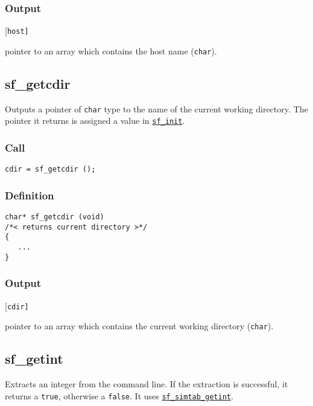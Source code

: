 \subsubsection*{Output}
\begin{desclist}{\tt }{\quad}[\tt host]
   \setlength\itemsep{0pt}
   \item[host] pointer to an array which contains the host name (\texttt{char}).
\end{desclist}




\subsection{{sf\_getcdir}}
Outputs a pointer of \texttt{char} type to the name of the current working directory. The pointer it returns is assigned a value in \hyperref[sec:sf_init]{\texttt{sf\_init}}.

\subsubsection*{Call}
\begin{verbatim}cdir = sf_getcdir ();\end{verbatim}

\subsubsection*{Definition}
\begin{verbatim}
char* sf_getcdir (void) 
/*< returns current directory >*/
{
   ...
}
\end{verbatim}

\subsubsection*{Output}
\begin{desclist}{\tt }{\quad}[\tt cdir]
   \setlength\itemsep{0pt}
   \item[cdir] pointer to an array which contains the current working directory (\texttt{char}).
\end{desclist}




\subsection{{sf\_getint}}
Extracts an integer from the command line. If the extraction is successful, it returns a \texttt{true}, otherwise a \texttt{false}.  It uses \hyperref[sec:sf_simtab_getint]{\texttt{sf\_simtab\_getint}}.

